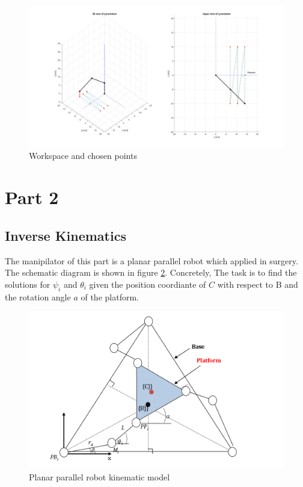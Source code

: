 \documentclass{article}
\begin{document}
\begin{figure}
\begin{center}
\includegraphics[width=\textwidth]{images/Trajectory_Cartesian}
\caption{Workspace and chosen points}
\label{fig:trajectories.cartesian}
\end{center}
\end{figure}

\section{Part 2}
\subsection{Inverse Kinematics}
The manipilator of this part is a planar parallel robot which applied in surgery. The schematic diagram is shown in  figure \ref{fig:Parallel}. Concretely, The task is to find the solutions for $\psi_i$ and $\theta_i$ given the position coordiante of $C$ with respect to B and the rotation angle $a$ of the platform.
\begin{figure}[htbp] 
\begin{center}
\includegraphics[width=\textwidth]{images/Parallel}
\caption{Planar parallel robot kinematic model}
\label{fig:Parallel}
\end{center}
\end{figure}
\end{document}
